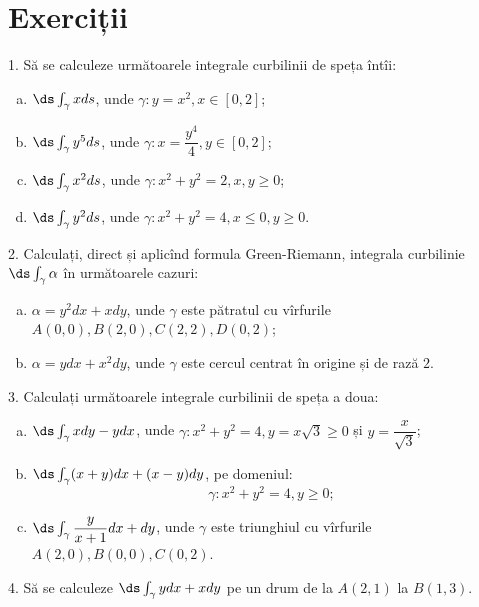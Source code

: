 \section{Exerciții}
1. Să se calculeze următoarele integrale curbilinii de speța întîi:
\begin{enumerate}[(a)]
\item $ \ds\int_\gamma xds $, unde $ \gamma : y = x^2, x \in [0, 2] $;
\item $ \ds\int_\gamma y^5ds $, unde $ \gamma : x = \dfrac{y^4}{4}, y \in [0, 2] $;
\item $ \ds\int_\gamma x^2ds $, unde $ \gamma: x^2 + y^2 = 2, x, y \geq 0 $;
\item $ \ds\int_\gamma y^2ds $, unde $ \gamma: x^2 + y^2 = 4, x \leq 0, y \geq 0 $.
\end{enumerate}

\vspace{0.3cm}

2. Calculați, direct și aplicînd formula Green-Riemann, integrala curbilinie
$ \ds\int_\gamma \alpha $ în următoarele cazuri:
\begin{enumerate}[(a)]
\item $ \alpha = y^2 dx + x dy $, unde $ \gamma $ este pătratul cu vîrfurile
  $ A(0,0), B(2, 0), C(2, 2), D(0, 2) $;
\item $ \alpha = ydx + x^2 dy $, unde $ \gamma $ este cercul centrat în origine
  și de rază $ 2 $.
\end{enumerate}

\vspace{0.3cm}

3. Calculați următoarele integrale curbilinii de speța a doua:
\begin{enumerate}[(a)]
\item $ \ds\int_\gamma xdy - ydx $, unde $ \gamma: x^2 + y^2 = 4, y = x\sqrt{3} \geq 0 $
  și $ y = \dfrac{x}{\sqrt{3}} $;
\item $ \ds\int_\gamma (x + y) dx + (x - y) dy $, pe domeniul:
  \[
    \gamma: x^2 + y^2 = 4, y \geq 0;
  \]
\item $ \ds\int_\gamma \dfrac{y}{x + 1} dx + dy $, unde $ \gamma $ este
  triunghiul cu vîrfurile $ A(2, 0), B(0, 0), C(0, 2) $.
\end{enumerate}

\vspace{0.3cm}

4. Să se calculeze $ \ds\int_\gamma ydx + xdy $ pe un drum de la $ A(2, 1) $
la $ B(1, 3) $.

